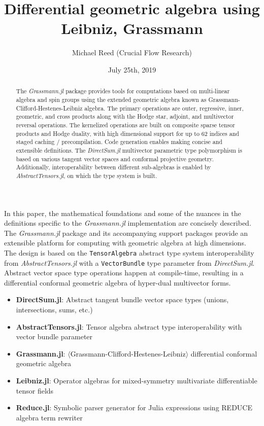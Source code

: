 \documentclass[]{article}
\author{Michael Reed (Crucial Flow Research)}
\title{Differential geometric algebra using Leibniz, Grassmann}
\date{July 25th, 2019}
\theoremstyle{definition}
\theoremstyle{remark}
\begin{document}
%

\maketitle

\begin{abstract}
	The \textit{Grassmann.jl}
	package provides tools for computations based on multi-linear algebra and spin groups using the extended geometric algebra known as Grassmann-Clifford-Hestenes-Leibniz algebra.
	The primary operations are
	outer, regressive, inner, geometric, and cross products along with the Hodge star, adjoint, and multivector reversal operations. 
	The kernelized operations are built on composite sparse tensor products and Hodge duality, with high dimensional support for up to 62 indices and staged caching / precompilation. Code generation enables making concise and extensible definitions.
	The \textit{DirectSum.jl}
	multivector parametric type polymorphism is based on various tangent vector spaces and conformal projective geometry.
	Additionally, interoperability between different sub-algebras is enabled by \textit{AbstractTensors.jl},
	on which the type system is built.
\end{abstract}

In this paper, the mathematical foundations and some of the nuances in the definitions specific to the \textit{Grassmann.jl} implementation are concisely described.
The \textit{Grassmann.jl} package and its accompanying support packages provide an extensible platform for computing with geometric algebra at high dimensions. 
The design is based on the \verb`TensorAlgebra` abstract type system interoperability from \textit{AbstractTensors.jl} with a \verb`VectorBundle` type parameter from \textit{DirectSum.jl}. Abstract vector space type operations happen at compile-time, resulting in a differential conformal geometric algebra of hyper-dual multivector forms.

\begin{itemize}
	\item \textbf{DirectSum.jl}: Abstract tangent bundle vector space types (unions, intersections, sums, etc.)
	\item \textbf{AbstractTensors.jl}: Tensor algebra abstract type interoperability with vector bundle parameter	
	\item \textbf{Grassmann.jl}: $\langle$Grassmann-Clifford-Hestenes-Leibniz$\rangle$ differential conformal geometric algebra
	\item \textbf{Leibniz.jl}: Operator algebras for mixed-symmetry multivariate differentiable tensor fields
	\item \textbf{Reduce.jl}: Symbolic parser generator for Julia expressions using REDUCE algebra term rewriter
\end{itemize}
\end{document}
